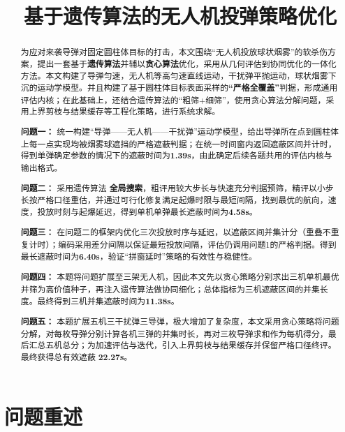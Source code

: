 \documentclass[withoutpreface,bwprint]{cumcmthesis} %
\title{基于遗传算法的无人机投弹策略优化}
\begin{document}
\maketitle

\begin{abstract}

	为应对来袭导弹对固定圆柱体目标的打击，本文围绕“无人机投放球状烟雾”的软杀伤方案，提出一套基于\textbf{遗传算法}并辅以\textbf{贪心算法}优化，采用从几何评估到协同优化的一体化方法。本文构建了导弹匀速，无人机等高匀速直线运动，干扰弹平抛运动，球状烟雾下沉的运动学模型。并且构建了基于圆柱体目标表面采样的\textbf{“严格全覆盖”}判据，形成通用评估内核；在此基础上，还结合遗传算法的“粗筛+细筛”，使用贪心算法分解问题，采用上界剪枝与结果缓存等工程化策略，进行系统求解。
	
	\textbf{问题一：}  统一构建“导弹——无人机——干扰弹”运动学模型，给出导弹所在点到圆柱体上每一点实现均被烟雾球遮挡的严格遮蔽判据；在统一时间窗内返回遮蔽区间并计时，得到单弹确定参数的情况下的遮蔽时间为\textbf{1.39s}，由此确定后续各题共用的评估内核与输出格式。
	
	\textbf{问题二：}  采用遗传算法 \textbf{全局搜索}，粗评用较大步长与快速充分判据预筛，精评以小步长按严格口径重估，并通过可行化修复满足起爆时限与最短间隔，找到最优的航向，速度，投放时刻与起爆延迟，得到单机单弹最长遮蔽时间为\textbf{4.58s}。

	\textbf{问题三：}  在问题二的框架内优化三次投放时序与延迟，以遮蔽区间并集计分（重叠不重复计时）；编码采用差分间隔以保证最短投放间隔，评估仍调用问题1的严格判据。得到最长遮蔽时间为\textbf{6.40s}，验证“拼窗延时”策略的有效性与稳健性。

	\textbf{问题四：}  本题将问题扩展至三架无人机，因此本文先以贪心策略分别求出三机单机最优并筛为高价值种子，再注入遗传算法做协同细化；总体指标为三机遮蔽区间的并集长度。最终得到三机并集遮蔽时间为\textbf{11.38s}。

	\textbf{问题五：}  本题扩展五机三干扰弹三导弹，极大增加了复杂度，本文采用贪心策略将问题分解，对每枚导弹分别计算各机三弹的并集时长，再对三枚导弹求和作为每机得分，最后汇总五机总分；为加速评估与迭代，引入上界剪枝与结果缓存并保留严格口径终评。最终获得总有效遮蔽 \textbf{22.27s}。


\end{abstract}

\section{问题重述}
\end{document}
